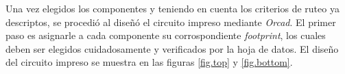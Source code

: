 Una vez elegidos los componentes y teniendo en cuenta los criterios de ruteo ya descriptos, se procedió al diseñó el circuito impreso mediante \textit{Orcad}. El primer paso es asignarle a cada componente su corrospondiente \textit{footprint}, los cuales deben ser elegidos cuidadosamente y verificados por la hoja de datos. El diseño del circuito impreso se muestra en las figuras \ref{fig.top} y \ref{fig.bottom}. 


